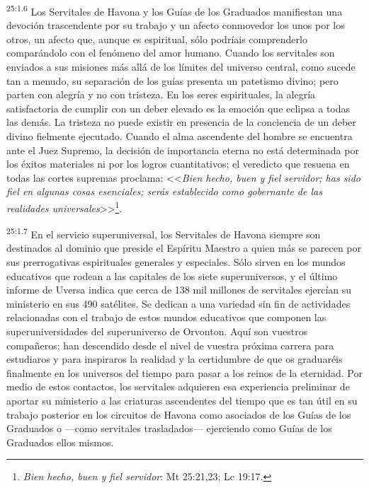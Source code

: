 \par
\textsuperscript{25:1.6} Los Servitales de Havona y los Guías de los Graduados manifiestan una devoción trascendente por su trabajo y un afecto conmovedor los unos por los otros, un afecto que, aunque es espiritual, sólo podríais comprenderlo comparándolo con el fenómeno del amor humano. Cuando los servitales son enviados a sus misiones más allá de los límites del universo central, como sucede tan a menudo, su separación de los guías presenta un patetismo divino; pero parten con alegría y no con tristeza. En los seres espirituales, la alegría satisfactoria de cumplir con un deber elevado es la emoción que eclipsa a todas las demás. La tristeza no puede existir en presencia de la conciencia de un deber divino fielmente ejecutado. Cuando el alma ascendente del hombre se encuentra ante el Juez Supremo, la decisión de importancia eterna no está determinada por los éxitos materiales ni por los logros cuantitativos; el veredicto que resuena en todas las cortes supremas proclama: <<\textit{Bien hecho, buen y \textit{fiel} servidor; has sido fiel en algunas cosas esenciales; serás establecido como gobernante de las realidades universales}>>\footnote{\textit{Bien hecho, buen y fiel servidor}: Mt 25:21,23; Lc 19:17.}.

\par
\textsuperscript{25:1.7} En el servicio superuniversal, los Servitales de Havona siempre son destinados al dominio que preside el Espíritu Maestro a quien más se parecen por sus prerrogativas espirituales generales y especiales. Sólo sirven en los mundos educativos que rodean a las capitales de los siete superuniversos, y el último informe de Uversa indica que cerca de 138 mil millones de servitales ejercían su ministerio en sus 490 satélites. Se dedican a una variedad sin fin de actividades relacionadas con el trabajo de estos mundos educativos que componen las superuniversidades del superuniverso de Orvonton. Aquí son vuestros compañeros; han descendido desde el nivel de vuestra próxima carrera para estudiaros y para inspiraros la realidad y la certidumbre de que os graduaréis finalmente en los universos del tiempo para pasar a los reinos de la eternidad. Por medio de estos contactos, los servitales adquieren esa experiencia preliminar de aportar su ministerio a las criaturas ascendentes del tiempo que es tan útil en su trabajo posterior en los circuitos de Havona como asociados de los Guías de los Graduados o ---como servitales trasladados--- ejerciendo como Guías de los Graduados ellos mismos.


